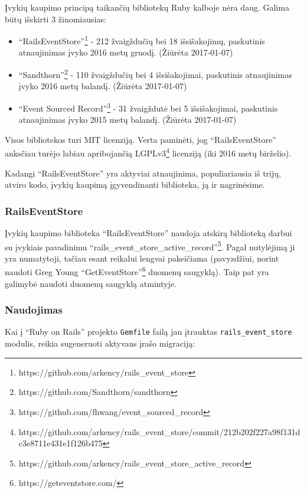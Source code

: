 Įvykių kaupimo principą taikančių bibliotekų Ruby kalboje nėra daug. Galima būtų išskirti 3 žinomiausias:

\begin{itemize}
  \item ``RailsEventStore''\footnote{https://github.com/arkency/rails\_event\_store} - 212 žvaigždučių bei 18 išsišakojimų, paskutinis atnaujinimas įvyko 2016 metų gruodį. (Žiūrėta 2017-01-07)

  \item ``Sandthorn''\footnote{https://github.com/Sandthorn/sandthorn} - 110 žvaigždučių bei 4 išsišakojimai, paskutinis atnaujinimas įvyko 2016 metų balandį. (Žiūrėta 2017-01-07)

  \item ``Event Sourced Record''\footnote{https://github.com/fhwang/event\_sourced\_record} - 31 žvaigždutė bei 5 išsišakojimai, paskutinis atnaujinimas įvyko 2015 metų balandį. (Žiūrėta 2017-01-07)
\end{itemize}

Visos bibliotekos turi MIT licenziją. Verta paminėti, jog ``RailsEventStore'' anksčiau turėjo labiau apribojančią LGPLv3\footnote{https://github.com/arkency/rails\_event\_store/commit/212b202f227a98f131dc3e8711e431e1f126b475} licenziją (iki 2016 metų birželio).

Kadangi ``RailsEventStore'' yra aktyviai atnaujinima, populiariausia iš trijų, atviro kodo, įvykių kaupimą įgyvendinanti biblioteka, ją ir nagrinėsime.

\subsubsection{RailsEventStore}

Įvykių kaupimo biblioteka ``RailsEventStore'' naudoja atskirą biblioteką darbui su įvykiais pavadinimu ``rails\_event\_store\_active\_record''\footnote{https://github.com/arkency/rails\_event\_store\_active\_record}. Pagal nutylėjimą ji yra numatytoji, tačiau esant reikalui lengvai pakeičiama (pavyzdžiui, norint naudoti Greg Young ``GetEventStore''\footnote{https://geteventstore.com/} duomenų saugyklą). Taip pat yra galimybė naudoti duomenų saugyklą atmintyje.

\subsubsection{Naudojimas}

Kai į ``Ruby on Rails'' projekto \lstinline|Gemfile| failą jau įtrauktas \lstinline|rails_event_store| modulis, reikia sugeneruoti aktyvaus įrašo migraciją:

